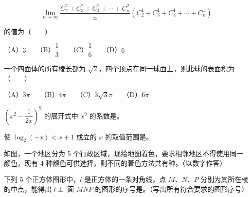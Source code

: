 \begin{question}

\nopagebreak[4]
\[
\lim_{n\to\infty}
\frac{C_2^2+C_3^2+C_4^2+\cdots+C_n^2}
n(C_2^1+C_3^1+C_4^1+\cdots+C_n^1)
\]

的值为\mbox{（　　）}

（A）$3$　　（B）$\dfrac13$　　（C）$\dfrac16$　　（D）$6$

\end{question}
\begin{question}
一个四面体的所有棱长都为 $\sqrt2$，四个顶点在同一球面上，则此球的表面积为\mbox{（　　）}

（A）$3\pi$　　（B）$4\pi$　　（C）$3\sqrt3\pi$　　（D）$6\pi$

\end{question}

\begin{question}
$\left(x^2-\dfrac1{2x}\right)^9$ 的展开式中 $x^9$ 的系数是\gkblank{}。

\end{question}
\begin{question}
使 $\log_2(-x)<x+1$ 成立的 $x$ 的取值范围是\gkblank{}。

\Needspace{0.4\textheight}
\end{question}
\begin{question}
如图，一个地区分为 5 个行政区域，现给地图着色，要求相邻地区不得使用同一颜色，现有 4 种颜色可供选择，则不同的着色方法共有\gkblank{}种。（以数字作答）
\nopagebreak[4]
\begin{center}\end{center}
\nopagebreak[4]
\Needspace{0.4\textheight}
\end{question}
\begin{question}
下列 5 个正方体图形中，$l$ 是正方体的一条对角线，点 $M\text{、}N\text{、}P$ 分别为其所在棱的中点，能得出 $l\perp$ 面 $MNP$ 的图形的序号是\gkblank{}。（写出所有符合要求的图形序号）
\nopagebreak[4]
\begin{center}\end{center}
\nopagebreak[4]
\end{question}


